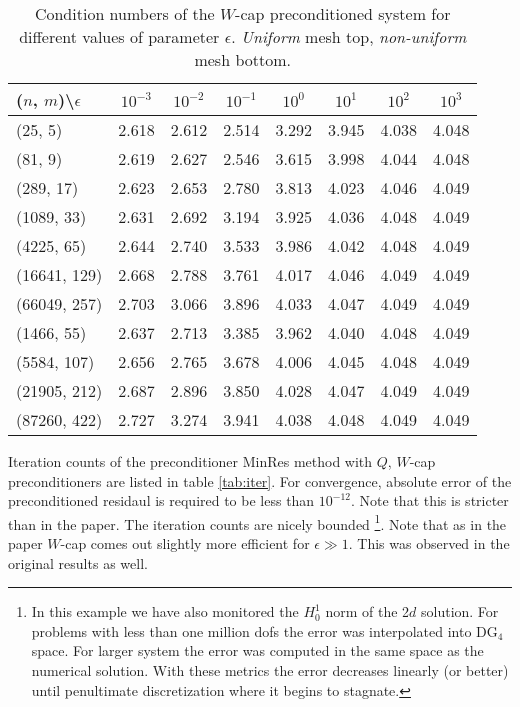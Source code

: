 \documentclass[10pt, a4paper]{article}
\begin{document}
%
\begin{table}[hb]
  \caption{Condition numbers of the $W$-cap preconditioned system for different 
  values of parameter $\epsilon$. \textit{Uniform} mesh top, \textit{non-uniform} 
  mesh bottom.
}
\label{tab:cond_Wcap}
\footnotesize{
\begin{tabular}{l|ccccccc}
\hline
($n$, $m$)\textbackslash $\epsilon$ & $10^{-3}$ & $10^{-2}$ & $10^{-1}$ & $10^{0}$ & $10^{1}$ & $10^{2}$ & $10^{3}$\\
\hline
(25, 5) & 2.618 & 2.612 & 2.514 & 3.292 & 3.945 & 4.038 & 4.048\\
(81, 9) & 2.619 & 2.627 & 2.546 & 3.615 & 3.998 & 4.044 & 4.048\\
(289, 17) & 2.623 & 2.653 & 2.780 & 3.813 & 4.023 & 4.046 & 4.049\\
(1089, 33) & 2.631 & 2.692 & 3.194 & 3.925 & 4.036 & 4.048 & 4.049\\
(4225, 65) & 2.644 & 2.740 & 3.533 & 3.986 & 4.042 & 4.048 & 4.049\\
(16641, 129) & 2.668 & 2.788 & 3.761 & 4.017 & 4.046 & 4.049 & 4.049\\
(66049, 257) & 2.703 & 3.066 & 3.896 & 4.033 & 4.047 & 4.049 & 4.049\\
\hline
\hline
(1466, 55) & 2.637 & 2.713 & 3.385 & 3.962 & 4.040 & 4.048 & 4.049\\
(5584, 107) & 2.656 & 2.765 & 3.678 & 4.006 & 4.045 & 4.048 & 4.049\\
(21905, 212) & 2.687 & 2.896 & 3.850 & 4.028 & 4.047 & 4.049 & 4.049\\
(87260, 422) & 2.727 & 3.274 & 3.941 & 4.038 & 4.048 & 4.049 & 4.049\\
\hline
\end{tabular}
}
\end{table}

Iteration counts of the preconditioner MinRes method with $Q$, $W$-cap preconditioners 
are listed in table \ref{tab:iter}. For convergence, absolute error of the preconditioned 
residaul is required to be less than $10^{-12}$. Note that this is stricter 
than in the paper. The iteration counts are nicely bounded
\footnote{In this example we have also monitored the $H^1_0$ norm of the 2$d$ solution. 
For problems with less than one million dofs the error was interpolated into DG$_4$ 
space. For larger system the error was computed in the same space as the numerical 
solution. With these metrics the error decreases linearly (or better) until penultimate 
discretization where it begins to stagnate.}. Note
that as in the paper $W$-cap comes out slightly more efficient for $\epsilon\gg 1$. 
This was observed in the original results as well.
\end{document}
